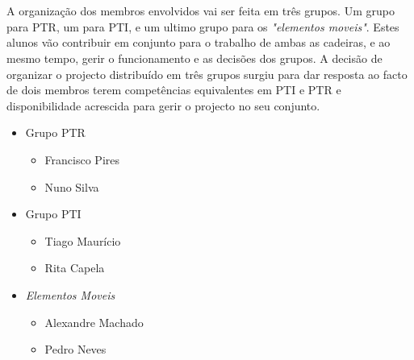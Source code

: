 \documentclass[12pt, a4paper, twoside]{report} %
\begin{document}

\clearpage


\\
\\
A organização dos membros envolvidos vai ser feita em três grupos.
Um grupo para PTR, um para PTI, e um ultimo grupo para os \textit {"elementos moveis"}. 
Estes alunos vão contribuir em conjunto para o trabalho de ambas as cadeiras, e ao mesmo tempo, gerir o funcionamento e as decisões dos grupos.
A decisão de organizar o projecto distribuído em três grupos surgiu para dar resposta ao facto de dois membros terem competências equivalentes em PTI e PTR e disponibilidade acrescida para gerir o projecto no seu conjunto.

\begin{itemize}
\item Grupo PTR
\begin{itemize}
	\item Francisco Pires
	\item Nuno Silva
\end{itemize}
\item Grupo PTI
\begin{itemize}
	\item Tiago Maurício
	\item Rita Capela
\end{itemize}
\item \textit{Elementos Moveis}
\begin{itemize}
	\item Alexandre Machado
	\item Pedro Neves
\end{itemize}
\end{itemize}
\end{document}
